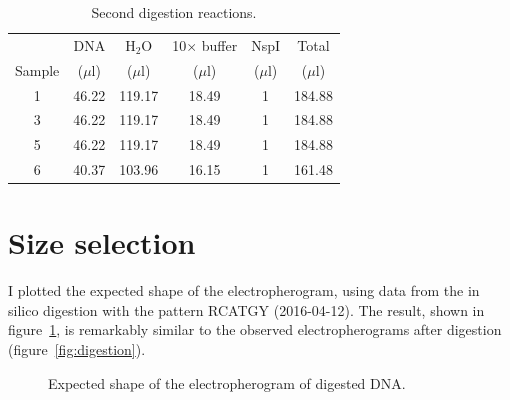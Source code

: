 \documentclass[a4paper,12pt]{article}
\begin{document}
\begin{table}
\begin{center}
\caption{Second digestion reactions.}\label{tau:digestion2}
\vspace*{0.3cm}
\begin{tabular}{cccccc}
\toprule
      &DNA&H$_2$O&10$\times$ buffer&NspI&Total\\
Sample&($\mu$l)&($\mu$l)&($\mu$l)&($\mu$l)&($\mu$l)\\
\midrule
1&46.22&119.17&18.49&1&184.88\\
3&46.22&119.17&18.49&1&184.88\\
5&46.22&119.17&18.49&1&184.88\\
6&40.37&103.96&16.15&1&161.48\\
\bottomrule
\end{tabular}
\end{center}
\end{table}

\section{Size selection}
I plotted the expected shape of the electropherogram, using data from the in silico digestion with the pattern RCATGY (2016-04-12). The result, shown in figure~\ref{fig:expected}, is remarkably similar to the observed electropherograms after digestion (figure~\ref{fig:digestion}).

\begin{figure}
\caption{Expected shape of the electropherogram of digested DNA.}\label{fig:expected}
\end{figure}
\end{document}
